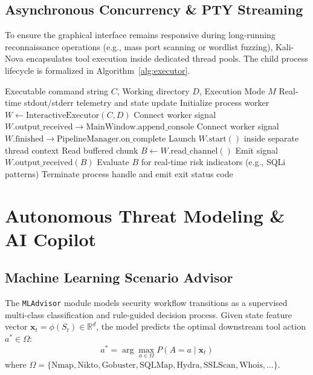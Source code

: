 \documentclass[conference]{IEEEtran}
\begin{document}
\subsection{Asynchronous Concurrency \& PTY Streaming}
To ensure the graphical interface remains responsive during long-running reconnaissance operations (e.g., mass port scanning or wordlist fuzzing), Kali-Nova encapsulates tool execution inside dedicated thread pools. The child process lifecycle is formalized in Algorithm~\ref{alg:executor}.

\begin{algorithm}[htbp]
\caption{Non-Blocking Interactive Tool Execution}
\label{alg:executor}
\begin{algorithmic}[1]
\REQUIRE Executable command string $C$, Working directory $D$, Execution Mode $M$
\ENSURE Real-time stdout/stderr telemetry and state update
\STATE Initialize process worker $W \leftarrow \text{InteractiveExecutor}(C, D)$
\STATE Connect worker signal $W.\text{output\_received} \rightarrow \text{MainWindow.append\_console}$
\STATE Connect worker signal $W.\text{finished} \rightarrow \text{PipelineManager.on\_complete}$
\STATE Launch $W.\text{start}()$ inside separate thread context
    \STATE Read buffered chunk $B \leftarrow W.\text{read\_channel}()$
        \STATE Emit signal $W.\text{output\_received}(B)$
        \STATE Evaluate $B$ for real-time risk indicators (e.g., SQLi patterns)
    \ENDIF
\ENDWHILE
\STATE Terminate process handle and emit exit status code
\end{algorithmic}
\end{algorithm}

\section{Autonomous Threat Modeling \& AI Copilot}

\subsection{Machine Learning Scenario Advisor}
The \texttt{MLAdvisor} module models security workflow transitions as a supervised multi-class classification and rule-guided decision process. Given state feature vector $\mathbf{x}_t = \phi(S_t) \in \mathbb{R}^d$, the model predicts the optimal downstream tool action $a^* \in \Omega$:
\begin{equation}
a^* = \arg\max_{a \in \Omega} P(A = a \mid \mathbf{x}_t)
\end{equation}
where $\Omega = \{\text{Nmap}, \text{Nikto}, \text{Gobuster}, \text{SQLMap}, \text{Hydra}, \text{SSLScan}, \text{Whois}, \dots\}$.
\end{document}
